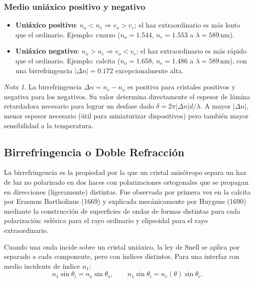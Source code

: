 \documentclass[12pt, a4paper]{article}
\theoremstyle{plain}
\theoremstyle{definition}
\theoremstyle{remark}
\newtheorem*{nota}{Nota}
\begin{document}
\subsubsection{Medio uniáxico positivo y negativo}

\begin{itemize}
  \item \textbf{Uniáxico positivo}: $n_o < n_e \Rightarrow v_o > v_e$;
        el haz extraordinario es más lento que el ordinario. Ejemplo:
        cuarzo ($n_o = 1.544$, $n_e = 1.553$ a $\lambda = 589\,\text{nm}$).
  \item \textbf{Uniáxico negativo}: $n_o > n_e \Rightarrow v_o < v_e$;
        el haz extraordinario es más rápido que el ordinario. Ejemplo:
        calcita ($n_o = 1.658$, $n_e = 1.486$ a $\lambda = 589\,\text{nm}$),
        con una birrefringencia $|\Delta n| = 0.172$ excepcionalmente alta.
\end{itemize}

\begin{nota}
La birrefringencia $\Delta n = n_e - n_o$ es positiva para cristales
positivos y negativa para los negativos. Su valor determina directamente
el espesor de lámina retardadora necesario para lograr un desfase dado
$\delta = 2\pi|\Delta n|d/\lambda$. A mayor $|\Delta n|$, menor espesor
necesario (útil para miniaturizar dispositivos) pero también mayor
sensibilidad a la temperatura.
\end{nota}

\subsection{Birrefringencia o Doble Refracción}

La birrefringencia es la propiedad por la que un cristal anisótropo separa un
haz de luz no polarizado en dos haces con polarizaciones ortogonales que se
propagan en direcciones (ligeramente) distintas. Fue observada por primera vez
en la calcita por Erasmus Bartholinus (1669) y explicada mecánicamente por
Huygens (1690) mediante la construcción de superficies de ondas de formas
distintas para cada polarización: esférica para el rayo ordinario y
elipsoidal para el rayo extraordinario.

Cuando una onda incide sobre un cristal uniáxico, la ley de Snell se aplica
por separado a cada componente, pero con índices distintos. Para una interfaz
con medio incidente de índice $n_1$:
\begin{equation}
  n_1\sin\theta_i = n_o\sin\theta_o,
  \qquad
  n_1\sin\theta_i = n_e(\theta)\sin\theta_e.
  \label{eq:snell_birrefringencia}
\end{equation}
\end{document}
